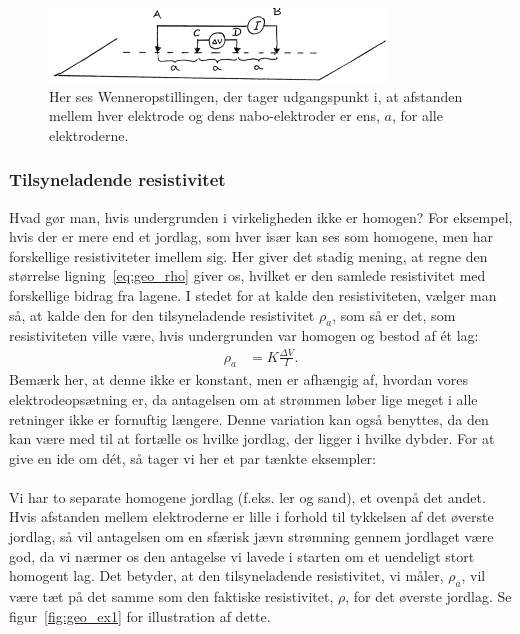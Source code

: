 %
\begin{figure}
    \centering
    \includegraphics[width=0.8\textwidth]{Geo/Figurer/Wenner-opstilling.png}
    \caption{Her ses Wenneropstillingen, der tager udgangspunkt i, at afstanden mellem hver elektrode og dens nabo-elektroder er ens, $a$, for alle elektroderne.}
    \label{fig:Wenneropstilling}
\end{figure}
%
\subsubsection{Tilsyneladende resistivitet}
Hvad gør man, hvis undergrunden i virkeligheden ikke er homogen? For eksempel, hvis der er mere end et jordlag, som hver især kan ses som homogene, men har forskellige resistiviteter imellem sig. Her giver det stadig mening, at regne den størrelse ligning~\eqref{eq:geo_rho} giver os, hvilket er den samlede resistivitet med forskellige bidrag fra lagene. I stedet for at kalde den resistiviteten, vælger man så, at kalde den for den tilsyneladende resistivitet $\rho_a$, som så er det, som resistiviteten ville være, hvis undergrunden var homogen og bestod af ét lag:
\begin{align}
    \rho _a &= K \frac{\Delta V}{I}.
\end{align}
Bemærk her, at denne ikke er konstant, men er afhængig af, hvordan vores elektrodeopsætning er, da antagelsen om at strømmen løber lige meget i alle retninger ikke er fornuftig længere. Denne variation kan også benyttes, da den kan være med til at fortælle os hvilke jordlag, der ligger i hvilke dybder. For at give en ide om dét, så tager vi her et par tænkte eksempler:\\\\
%
%
Vi har to separate homogene jordlag (f.eks. ler og sand), et ovenpå det andet. Hvis afstanden mellem elektroderne er lille i forhold til tykkelsen af det øverste jordlag, så vil antagelsen om en sfærisk jævn strømning gennem jordlaget være god, da vi nærmer os den antagelse vi lavede i starten om et uendeligt stort homogent lag. Det betyder, at den tilsyneladende resistivitet, vi måler, $\rho_a$, vil være tæt på det samme som den faktiske resistivitet, $\rho$, for det øverste jordlag. Se figur~\ref{fig:geo_ex1} for illustration af dette. \\
